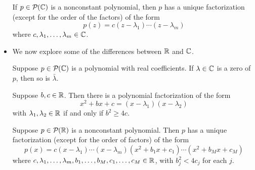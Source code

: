 \documentclass[../main.tex]{subfiles}
\begin{document}
\begin{itemize}
    \begin{theorem}
        If $p\in\mathcal{P}_{}(\mathbb{C})$ is a nonconstant polynomial, then $p$ has a unique factorization (except for the order of the factors) of the form
        \begin{equation*}
            p(z) = c(z-\lambda_1)\cdots(z-\lambda_m)
        \end{equation*}
        where $c,\lambda_1,\dots,\lambda_m\in\mathbb{C}$.
    \end{theorem}
    \item We now explore some of the differences between $\mathbb{R}$ and $\mathbb{C}$.
    \begin{theorem}
        Suppose $p\in\mathcal{P}_{}(\mathbb{C})$ is a polynomial with real coefficients. If $\lambda\in\mathbb{C}$ is a zero of $p$, then so is $\bar{\lambda}$.
    \end{theorem}
    \begin{theorem}
        Suppose $b,c\in\mathbb{R}$. Then there is a polynomial factorization of the form
        \begin{equation*}
            x^2+bx+c = (x-\lambda_1)(x-\lambda_2)
        \end{equation*}
        with $\lambda_1,\lambda_2\in\mathbb{R}$ if and only if $b^2\geq 4c$.
    \end{theorem}
    \begin{theorem}
        Suppose $p\in\mathcal{P}_{}(\mathbb{R})$ is a nonconstant polynomial. Then $p$ has a unique factorization (except for the order of factors) of the form
        \begin{equation*}
            p(x) = c(x-\lambda_1)\cdots(x-\lambda_m)(x^2+b_1x+c_1)\cdots(x^2+b_Mx+c_M)
        \end{equation*}
        where $c,\lambda_1,\dots,\lambda_m,b_1,\dots,b_M,c_1,\dots,c_M\in\mathbb{R}$, with $b_j^2<4c_j$ for each $j$.
    \end{theorem}
\end{itemize}
\end{document}
